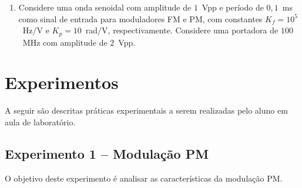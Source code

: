 \documentclass[12pt,addpoints]{exam}
\begin{document}
\begin{enumerate}
    \item Considere uma onda senoidal com amplitude de $1$~Vpp e período de $0,1$~ms como sinal de entrada para moduladores FM e PM, com constantes $K_f = 10^5$~Hz/V e $K_{p} = 10$~rad/V, respectivamente. Considere uma portadora de $100$~MHz com amplitude de $2$~Vpp.
\end{enumerate}

\section{Experimentos}

A seguir são descritas práticas experimentais a serem realizadas pelo aluno em aula de laboratório. 

\subsection{Experimento 1 -- Modulação PM}

O objetivo deste experimento é analisar as características da modulação PM.
\end{document}

